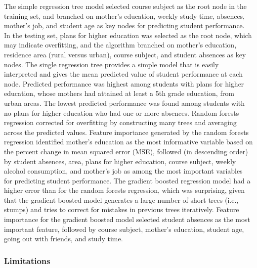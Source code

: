 \documentclass[sigconf]{acmart}
\begin{document}

The simple regression tree model selected course subject as the root node in 
the training set, and branched on mother's education, weekly study time, 
absences, mother's job, and student age as key nodes for predicting student 
performance. In the testing set, plans for higher education was selected as 
the root node, which may indicate overfitting, and the algorithm branched on
mother's education, residence area (rural versus urban), course subject, and 
student absences as key nodes. The single regression tree provides a simple 
model that is easily interpreted and gives the mean predicted value of 
student performance at each node. Predicted performance was highest among 
students with plans for higher education, whose mothers had attained at 
least a 5th grade education, from urban areas. The lowest predicted 
performance was found among students with no plans for higher education 
who had one or more absences. Random forests regression corrected for 
overfitting by constructing many trees and averaging across the predicted 
values. Feature importance generated by the random forests regression 
identified mother's education as the most informative variable based on the 
percent change in mean squared error (MSE), followed (in descending order) by 
student absences, area, plans for higher education, course subject, weekly
alcohol consumption, and mother's job as among the most important variables
for predicting student performance. The gradient boosted regression model 
had a higher error than for the random forests regression, which was surprising, 
given that the gradient boosted model generates a large number of short trees 
(i.e., stumps) and tries to correct for mistakes in previous trees iteratively. 
Feature importance for the gradient boosted model selected student absences 
as the most important feature, followed by course subject, mother's education, 
student age, going out with friends, and study time.


\subsubsection{Limitations}
\end{document}
